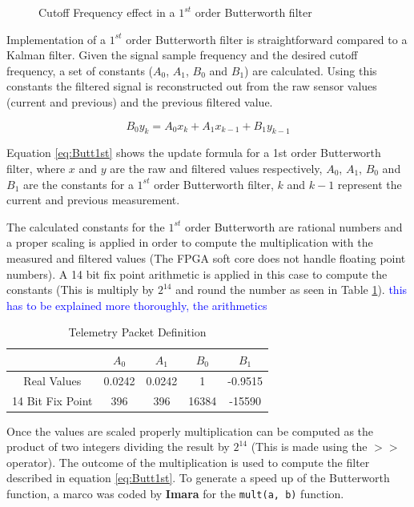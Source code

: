 \documentclass{article}
\newcommand\todo[1]{\textcolor{blue}{#1}} %
\begin{document}
\begin{figure}[ht]
\centering
	\caption{Cutoff Frequency effect in a $1^{st}$ order Butterworth filter}
	\label{fig.NoiseComp}
\end{figure}

Implementation of a $1^{st}$ order Butterworth filter is straightforward compared to a Kalman filter. Given the signal sample frequency and the desired cutoff frequency, a set of constants ($A_0$, $A_1$, $B_0$ and $B_1$) are calculated. Using this constants the filtered signal is reconstructed out from the raw sensor values (current and previous) and the previous filtered value.

\begin{equation}
	 B_0 y_k = A_0 x_k + A_1 x_{k-1} + B_1 y_{k-1}
	 \label{eq:Butt1st}
\end{equation}

Equation \ref{eq:Butt1st} shows the update formula for a 1st order Butterworth filter, where $x$ and $y$ are the raw and filtered values respectively, $A_0$, $A_1$, $B_0$ and $B_1$ are the constants for a $1^{st}$ order Butterworth filter, $k$ and $k-1$ represent the current and previous measurement.

The calculated constants for the $1^{st}$ order Butterworth are rational numbers and a proper scaling is applied in order to compute the multiplication with the measured and filtered values (The FPGA soft core does not handle floating point numbers). A 14 bit fix point arithmetic is applied in this case to compute the constants (This is multiply by $2^{14}$ and round the number as seen in Table \ref{tbl:ButtConstants}). \todo{this has to be explained more thoroughly, the arithmetics}

\begin{table}[ht]
\centering
\caption{Telemetry Packet Definition}
\begin{tabular}{|c|c|c|c|c|}
\hline 
 & $A_0$ & $A_1$ & $B_0$ & $B_1$ \\ 
\hline 
Real Values & 0.0242 & 0.0242 & 1 & -0.9515 \\ 
\hline 
14 Bit Fix Point & 396 & 396 & 16384 & -15590 \\ 
\hline 
\end{tabular}
\label{tbl:ButtConstants}
\end{table}

Once the values are scaled properly multiplication can be computed as the product of two integers dividing the result by $2^{14}$ (This is made using the $>>$ operator). The outcome of the multiplication is used to compute the filter described in equation \ref{eq:Butt1st}. To generate a speed up of the Butterworth function, a marco was coded by \textbf{Imara} for the \texttt{mult(a, b)} function. 
\end{document}
